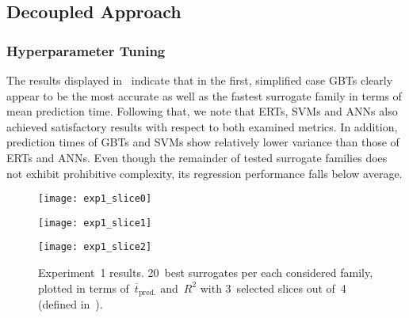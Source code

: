 \subsection{Decoupled Approach}
\label{sec:modelres}

\subsubsection{Hyperparameter Tuning}
\label{sec:res-exp12}

The results displayed in~ indicate that in the first,
simplified case GBTs clearly appear to be the most accurate as well as the
fastest surrogate family in terms of mean prediction time. Following that, we
note that ERTs, SVMs and ANNs also achieved satisfactory results with respect to
both examined metrics. In addition, prediction times of GBTs and SVMs show
relatively lower variance than those of ERTs and ANNs. Even though the remainder
of tested surrogate families does not exhibit prohibitive complexity, its
regression performance falls below average.

\begin{figure}
	\centering
	\hspace*{-0.1\columnwidth}
	\texttt{[image: exp1\_slice0]}

	\vfill

	\hspace*{-0.1\columnwidth}
	\texttt{[image: exp1\_slice1]}

	\vfill

	\hspace*{-0.1\columnwidth}
	\texttt{[image: exp1\_slice2]}

	\caption{\label{fig:exp1-time-vs-reg}Experiment~1 results. 20~best surrogates per each considered family, plotted in
		terms of~$\overline{t}_{\text{pred.}}$ and~$R^2$ with 3~selected slices out
	of~4 (defined in~).}
\end{figure}

